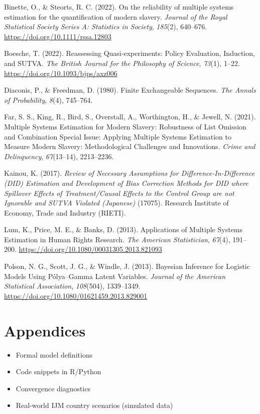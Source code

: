 \documentclass[
  12pt,
]{article}
\providecommand{\tightlist}{%
  \setlength{\itemsep}{0pt}\setlength{\parskip}{0pt}}\usepackage{longtable,booktabs,array}
\newlength{\cslhangindent}
\newenvironment{CSLReferences}[2] %
 {\begin{list}{}{%
  \setlength{\itemindent}{0pt}
  \setlength{\leftmargin}{0pt}
  \setlength{\parsep}{0pt}
  \ifodd #1
   \setlength{\leftmargin}{\cslhangindent}
   \setlength{\itemindent}{-1\cslhangindent}
  \fi
  \setlength{\itemsep}{#2\baselineskip}}}
 {\end{list}}
\theoremstyle{plain}
\theoremstyle{definition}
\begin{document}
\label{refs}
\begin{CSLReferences}{1}{0}
Binette, O., \& Steorts, R. C. (2022). On the reliability of multiple
systems estimation for the quantification of modern slavery.
\emph{Journal of the Royal Statistical Society Series A: Statistics in
Society}, \emph{185}(2), 640--676.
\url{https://doi.org/10.1111/rssa.12803}

Boesche, T. (2022). Reassessing {Quasi-experiments}: {Policy
Evaluation}, {Induction}, and {SUTVA}. \emph{The British Journal for the
Philosophy of Science}, \emph{73}(1), 1--22.
\url{https://doi.org/10.1093/bjps/axz006}

Diaconis, P., \& Freedman, D. (1980). Finite {Exchangeable Sequences}.
\emph{The Annals of Probability}, \emph{8}(4), 745--764.

Far, S. S., King, R., Bird, S., Overstall, A., Worthington, H., \&
Jewell, N. (2021). Multiple {Systems Estimation} for {Modern Slavery}:
{Robustness} of {List Omission} and {Combination Special Issue}:
{Applying Multiple Systems Estimation} to {Measure Modern Slavery}:
{Methodological Challenges} and {Innovations}. \emph{Crime and
Delinquency}, \emph{67}(13--14), 2213--2236.

Kainou, K. (2017). \emph{Review of {Necessary Assumptions} for
{Difference-In-Difference} ({DID}) {Estimation} and {Development} of
{Bias Correction Methods} for {DID} where {Spillover Effects} of
{Treatment}/{Causal Effects} to the {Control Group} are not {Ignorable}
and {SUTVA Violated} ({Japanese})} (17075). {Research Institute of
Economy, Trade and Industry (RIETI).}

Lum, K., Price, M. E., \& Banks, D. (2013). Applications of {Multiple
Systems Estimation} in {Human Rights Research}. \emph{The American
Statistician}, \emph{67}(4), 191--200.
\url{https://doi.org/10.1080/00031305.2013.821093}

Polson, N. G., Scott, J. G., \& Windle, J. (2013). Bayesian {Inference}
for {Logistic Models Using Pólya}--{Gamma Latent Variables}.
\emph{Journal of the American Statistical Association}, \emph{108}(504),
1339--1349. \url{https://doi.org/10.1080/01621459.2013.829001}

\end{CSLReferences}

\newpage

\section{Appendices}\label{appendices}

\begin{itemize}
\tightlist
\item
  Formal model definitions\\
\item
  Code snippets in R/Python\\
\item
  Convergence diagnostics\\
\item
  Real-world IJM country scenarios (simulated data)
\end{itemize}
\end{document}
